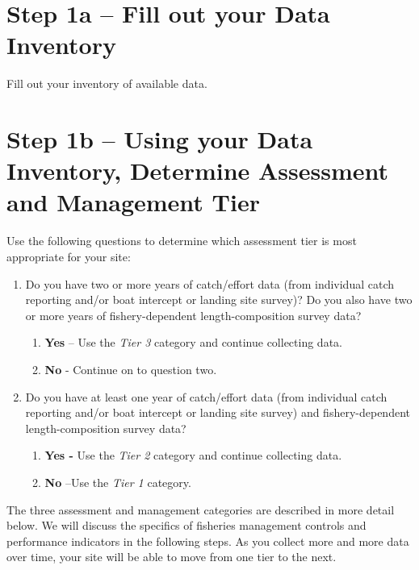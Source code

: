 \documentclass[]{book}
\begin{document}
\section{Step 1a -- Fill out your Data
Inventory}\label{step-1a-fill-out-your-data-inventory}

Fill out your inventory of available data.

\section{Step 1b -- Using your Data Inventory, Determine Assessment and
Management
Tier}\label{step-1b-using-your-data-inventory-determine-assessment-and-management-tier}

Use the following questions to determine which assessment tier is most
appropriate for your site:

\begin{enumerate}
\def\labelenumi{\arabic{enumi}.}
\item
  Do you have two or more years of catch/effort data (from individual
  catch reporting and/or boat intercept or landing site survey)? Do you
  also have two or more years of fishery-dependent length-composition
  survey data?

  \begin{enumerate}
  \def\labelenumii{\alph{enumii}.}
  \item
    \textbf{Yes} -- Use the \emph{Tier 3} category and continue
    collecting data.
  \item
    \textbf{No} - Continue on to question two.
  \end{enumerate}
\item
  Do you have at least one year of catch/effort data (from individual
  catch reporting and/or boat intercept or landing site survey) and
  fishery-dependent length-composition survey data?

  \begin{enumerate}
  \def\labelenumii{\alph{enumii}.}
  \item
    \textbf{Yes -} Use the \emph{Tier 2} category and continue
    collecting data.
  \item
    \textbf{No} --Use the \emph{Tier 1} category.
  \end{enumerate}
\end{enumerate}

The three assessment and management categories are described in more
detail below. We will discuss the specifics of fisheries management
controls and performance indicators in the following steps. As you
collect more and more data over time, your site will be able to move
from one tier to the next.
\end{document}
